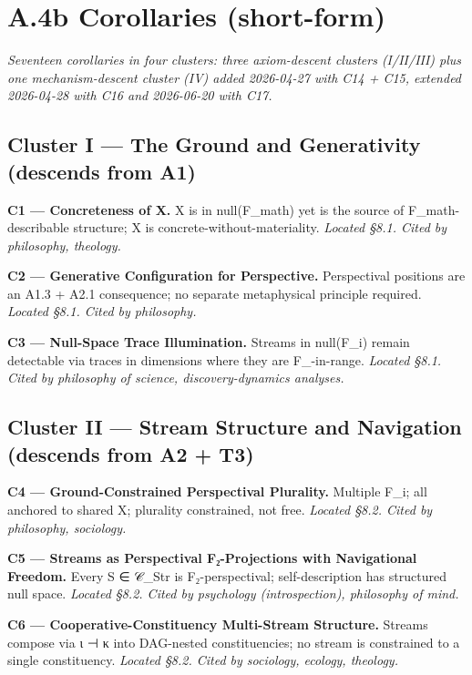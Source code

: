 \documentclass[11pt, openany]{book}
\newcommand{\sectionbreak}{\clearpage}
\begin{document}
\sectionbreak

\section{A.4b Corollaries (short-form)}

\textit{Seventeen corollaries in four clusters: three axiom-descent clusters (I/II/III) plus one mechanism-descent cluster (IV) added 2026-04-27 with C14 + C15, extended 2026-04-28 with C16 and 2026-06-20 with C17.}

\subsection{Cluster I --- The Ground and Generativity (descends from A1)}

\textbf{C1 --- Concreteness of X.} X is in null(F\_\allowbreak{}math) yet is the source of F\_\allowbreak{}math-describable structure; X is concrete-without-materiality. \textit{Located §8.1. Cited by philosophy, theology.}

\textbf{C2 --- Generative Configuration for Perspective.} Perspectival positions are an A1.3 + A2.1 consequence; no separate metaphysical principle required. \textit{Located §8.1. Cited by philosophy.}

\textbf{C3 --- Null-Space Trace Illumination.} Streams in null(F\_\allowbreak{}i) remain detectable via traces in dimensions where they are F\_-in-range. \textit{Located §8.1. Cited by philosophy of science, discovery-dynamics analyses.}

\subsection{Cluster II --- Stream Structure and Navigation (descends from A2 + T3)}

\textbf{C4 --- Ground-Constrained Perspectival Plurality.} Multiple F\_\allowbreak{}i; all anchored to shared X; plurality constrained, not free. \textit{Located §8.2. Cited by philosophy, sociology.}

\textbf{C5 --- Streams as Perspectival F₂-Projections with Navigational Freedom.} Every S ∈ 𝒞\_\allowbreak{}Str is F₂-perspectival; self-description has structured null space. \textit{Located §8.2. Cited by psychology (introspection), philosophy of mind.}

\textbf{C6 --- Cooperative-Constituency Multi-Stream Structure.} Streams compose via ι ⊣ κ into DAG-nested constituencies; no stream is constrained to a single constituency. \textit{Located §8.2. Cited by sociology, ecology, theology.}
\end{document}
